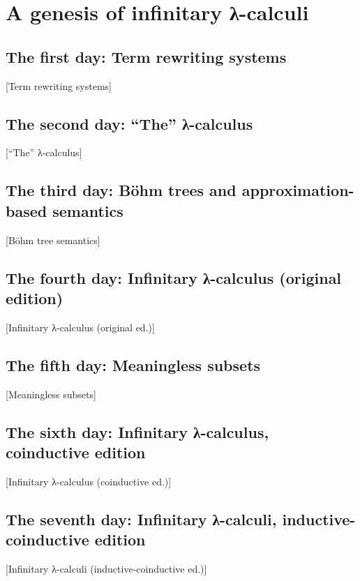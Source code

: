\chapter{A genesis of infinitary λ-calculi}
\label{chap:lambda}
\margintoc


\section{The first day: Term rewriting systems}%
[Term rewriting systems]

\lipsum[1]


\section{The second day: \enquote{The} λ-calculus}%
[\enquote{The} λ-calculus]

\lipsum[2]


\section{The third day: Böhm trees and approximation-based semantics}%
[Böhm tree semantics]

\lipsum[3]


\section{The fourth day: Infinitary λ-calculus (original edition)}%
[Infinitary λ-calculus (original ed.)]

\lipsum[4]


\section{The fifth day: Meaningless subsets}%
[Meaningless subsets]

\lipsum[5]


\section{The sixth day: Infinitary λ-calculus, coinductive edition}%
[Infinitary λ-calculus (coinductive ed.)]

\lipsum[6]


\section{The seventh day: Infinitary λ-calculi, inductive-coinductive edition}%
[Infinitary λ-calculi (inductive-coinductive ed.)]

\lipsum[7]



